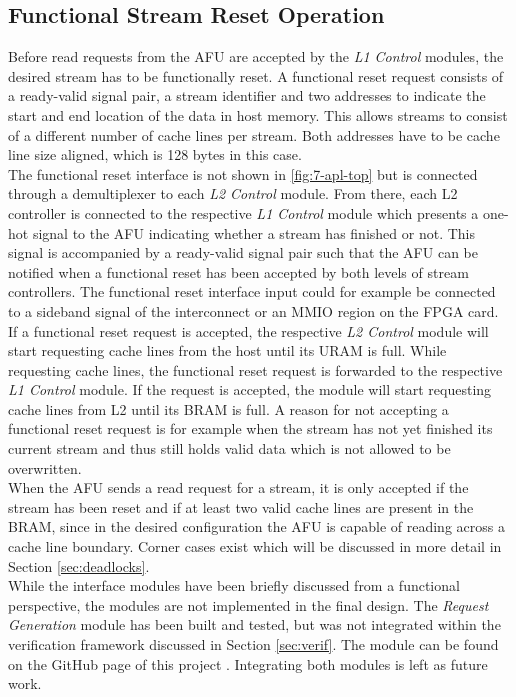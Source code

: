 \subsection{Functional Stream Reset Operation}
Before read requests from the AFU are accepted by the \textit{L1 Control} modules, the desired stream has to be functionally reset. A functional reset request consists of a ready-valid signal pair, a stream identifier and two addresses to indicate the start and end location of the data in host memory. This allows streams to consist of a different number of cache lines per stream. Both addresses have to be cache line size aligned, which is 128 bytes in this case.\\
The functional reset interface is not shown in \autoref{fig:7-apl-top} but is connected through a demultiplexer to each \textit{L2 Control} module. From there, each L2 controller is connected to the respective \textit{L1 Control} module which presents a one-hot signal to the AFU indicating whether a stream has finished or not. This signal is accompanied by a ready-valid signal pair such that the AFU can be notified when a functional reset has been accepted by both levels of stream controllers. The functional reset interface input could for example be connected to a sideband signal of the interconnect or an MMIO region on the FPGA card.\\
If a functional reset request is accepted, the respective \textit{L2 Control} module will start requesting cache lines from the host until its URAM is full. While requesting cache lines, the functional reset request is forwarded to the respective \textit{L1 Control} module. If the request is accepted, the module will start requesting cache lines from L2 until its BRAM is full. A reason for not accepting a functional reset request is for example when the stream has not yet finished its current stream and thus still holds valid data which is not allowed to be overwritten.\\
When the AFU sends a read request for a stream, it is only accepted if the stream has been reset and if at least two valid cache lines are present in the BRAM, since in the desired configuration the AFU is capable of reading across a cache line boundary. Corner cases exist which will be discussed in more detail in Section \ref{sec:deadlocks}.\\
While the interface modules have been briefly discussed from a functional perspective, the modules are not implemented in the final design. The \textit{Request Generation} module has been built and tested, but was not integrated within the verification framework discussed in Section \ref{sec:verif}. The module can be found on the GitHub page of this project \cite{yvo-lib}. Integrating both modules is left as future work.





